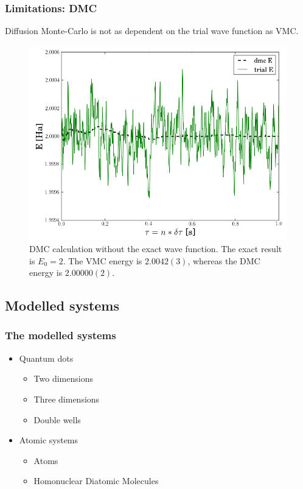 \begin{frame}
   \frametitle{Limitations: DMC}
   
   Diffusion Monte-Carlo is not as dependent on the trial wave function as VMC.
   
\end{frame}

\begin{frame}
 \begin{figure}
  \begin{center}
   \includegraphics[scale=0.35]{../graphics/DMC_notExactWF.png}
  \end{center}
  \caption{DMC calculation without the exact wave function. The exact result is $E_0=2$. The VMC energy is $2.0042(3)$, whereas the DMC energy is $2.00000(2)$.}
 \end{figure}
\end{frame}

\subsection{Modelled systems}

\begin{frame}
 \frametitle{The modelled systems}
 \begin{itemize}
  \item Quantum dots
  \begin{itemize}
  \item Two dimensions
  \item Three dimensions
  \item Double wells
  \end{itemize}
  \pause
  \item Atomic systems
  \begin{itemize}
  \item Atoms
  \item Homonuclear Diatomic Molecules
  \end{itemize}
 \end{itemize}
\end{frame}

